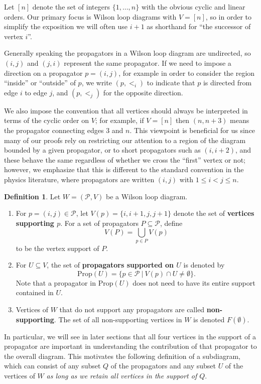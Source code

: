 \documentclass[11pt]{article}
\newcommand{\cP}{\mathcal{P}}
\newcommand{\Prop}{\textrm{Prop}}
\theoremstyle{remark}
\theoremstyle{definition}
\newtheorem{dfn}[thm]{Definition}
\begin{document}
Let $[n]$ denote the set of integers $\{1,\dots,n\}$ with the obvious cyclic and linear orders. Our primary focus is Wilson loop diagrams with $V = [n]$, so in order to simplify the exposition we will often use $i+1$ as shorthand for ``the successor of vertex $i$''. 

Generally speaking the propagators in a Wilson loop diagram are undirected, so $(i,j)$ and $(j,i)$ represent the same propagator. If we need to impose a direction on a propagator $p = (i,j)$, for example in order to consider the region ``inside'' or ``outside'' of $p$, we write $(p,<_i)$ to indicate that $p$ is directed from edge $i$ to edge $j$, and $(p,<_j)$ for the opposite direction.

We also impose the convention that all vertices should always be interpreted in terms of the cyclic order on $V$; for example, if $V = [n]$ then $(n,n+3)$ means the propagator connecting edges $3$ and $n$. This viewpoint is beneficial for us since many of our proofs rely on restricting our attention to a region of the diagram bounded by a given propagator, or to short propagators such as $(i,i+2)$, and these behave the same regardless of whether we cross the ``first'' vertex or not; however, we emphasize that this is different to the standard convention in the physics literature, where propagators are written $(i,j)$ with $1 \leq i<j \leq n$.



\begin{dfn} \label{VPropdfn}
Let $W = (\cP, V)$ be a Wilson loop diagram.
\begin{enumerate}
\item For $p = (i,j) \in \cP$, let $V(p) = \{i, i+1, j, j+1\}$ denote the set of {\bf vertices supporting $p$}. For a set of propagators $P \subseteq \cP$, define 
\[V(P) = \bigcup_{p \in P} V(p)\]
to be the vertex support of $P$.
\item For $U \subseteq V$, the set of {\bf propagators supported on $U$} is denoted by
\[\Prop(U) = \{ p \in \cP\ |\ V(p) \cap U \neq \emptyset \}.\]
Note that a propagator in $\Prop(U)$ does not need to have its entire support contained in $U$. 
\item Vertices of $W$ that do not support any propagators are called {\bf non-supporting}. The set of all non-supporting vertices in $W$ is denoted $F(\emptyset)$. 
\end{enumerate}
\end{dfn}

In particular, we will see in later sections that all four vertices in the support of a propagator are important in understanding the contribution of that propagator to the overall diagram. This motivates the following definition of a subdiagram, which can consist of any subset $Q$ of the propagators and any subset $U$ of the vertices of $W$ {\em as long as we retain all vertices in the support of $Q$}.
\end{document}
